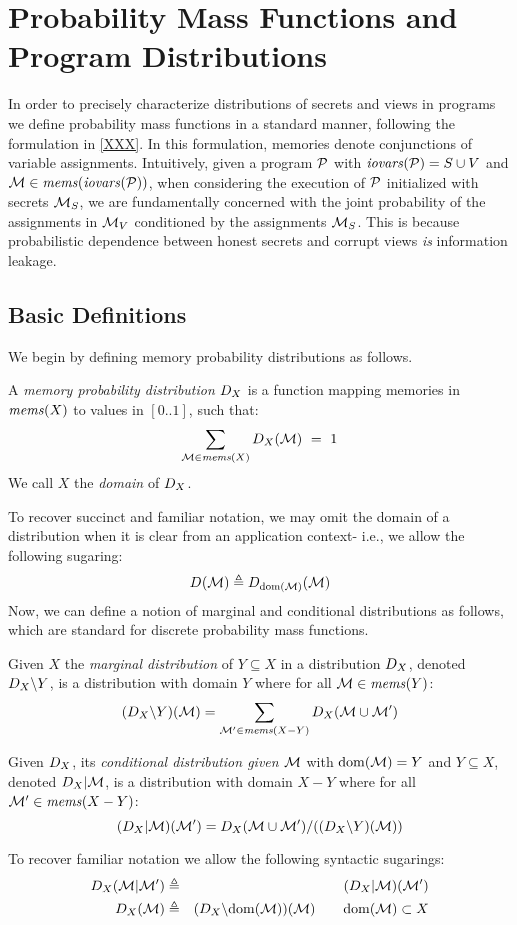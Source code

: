 \section{Probability Mass Functions and Program Distributions}

In order to precisely characterize distributions of secrets and views
in programs we define probability mass functions in a standard manner,
following the formulation in \ref{XXX}. In this formulation, memories
denote conjunctions of variable assignments. Intuitively, given a
program $\mathcal{P}$ with $\mathit{iovars}(\mathcal{P}) = S \cup V$ and $\mathcal{M} \in
\mathit{mems}(\mathit{iovars}(\mathcal{P}))$, when considering the execution of $\mathcal{P}$
initialized with secrets $\mathcal{M}_S$, we are fundamentally concerned
with the joint probability of the assignments in $\mathcal{M}_V$
conditioned by the assignments $\mathcal{M}_S$. This is because
probabilistic dependence between honest secrets and corrupt views
\emph{is} information leakage. 

\subsection{Basic Definitions} We begin by defining memory probability distributions as follows.
\begin{definition}
  A \emph{memory probability distribution} $D_{X}$ is a function
  mapping memories in $\mathit{mems}(X)$ to values in $[0..1]$, such that:
  $$
  \sum_{\mathcal{M} \in \mathit{mems}(X)} D_{X}(\mathcal{M}) \  = \ 1
  $$
  We call $X$ the \emph{domain} of $D_{X}$.
\end{definition}
To recover succinct and familiar notation, we may omit the domain of a
distribution when it is clear from an application context-
i.e., we allow the following sugaring:
$$
D_{}(\mathcal{M}) \triangleq D_{\mathrm{dom}(\mathcal{M})}(\mathcal{M})
$$
Now, we can define a notion of marginal and conditional
distributions as follows, which are standard for discrete
probability mass functions. 
\begin{definition}
  Given $X$ the \emph{marginal distribution} of $Y \subseteq X$
  in a distribution $D_{X}$, denoted $D_{X}\backslash Y$,
  is a distribution with domain $Y$ where for all
  $\mathcal{M} \in \mathit{mems}(Y)$:
  $$
  (D_{X}\backslash Y)(\mathcal{M}) =
  \sum_{\mathcal{M}' \in \mathit{mems}(X-Y)} D_{X}(\mathcal{M} \cup \mathcal{M}')
  $$
\end{definition}

\begin{definition}
  Given $D_{X}$, its \emph{conditional distribution given
  $\mathcal{M}$} with $\mathrm{dom}(\mathcal{M}) = Y$ and $Y \subseteq X$, denoted
  $D_{X}|\mathcal{M}$, is a distribution with domain $X - Y$ where for all
  $\mathcal{M}' \in \mathit{mems}(X - Y)$:
  $$
  (D_{X}|\mathcal{M})(\mathcal{M}') =
      D_{X}(\mathcal{M} \cup \mathcal{M}') / ((D_{X}\backslash Y)(\mathcal{M}))
  $$
\end{definition}
To recover familiar notation we allow the following syntactic
sugarings:
\begin{eqnarray*}
D_{X}(\mathcal{M}|\mathcal{M}') &\triangleq& (D_{X}|\mathcal{M})(\mathcal{M}')\\
D_{X}(\mathcal{M}) &\triangleq& (D_{X}\backslash\mathrm{dom}(\mathcal{M}))(\mathcal{M}) \qquad \mathrm{dom}(\mathcal{M}) \subset X
\end{eqnarray*}

